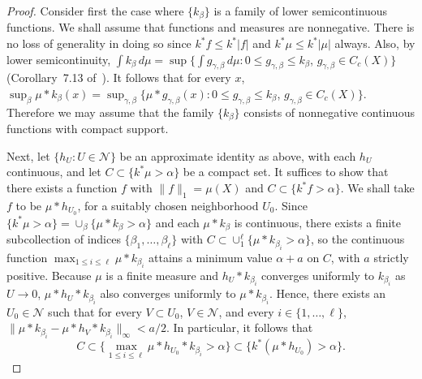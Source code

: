 \documentclass[12pt,a4paper]{amsart}
\theoremstyle{plain}
\theoremstyle{remark}
\begin{document}
\begin{proof}
Consider first the case where $\{k_{\beta}\}$ is a family of
lower semicontinuous functions. We shall assume that
functions and measures are nonnegative.
There is no loss of generality in doing so since
$k^* f \le k^*|f|$ and
$k^*\mu \le k^*|\mu|$
always. Also,
by lower semicontinuity,
$\int k_{\beta} \, d\mu = \sup \{\int g_{\gamma,\beta} \, d\mu :
0\le g_{\gamma ,\beta} \le k_\beta$,
$g_{\gamma,\beta} \in C_c(X)\}$ (Corollary~7.13 of~\cite{Fo}).
It follows that for every $x$,
$\sup_\beta \mu *k_{\beta} (x) = \sup_{\gamma, \beta}
\{\mu *g_{\gamma,\beta} (x): 0\le g_{\gamma ,\beta} \le k_\beta$,
$g_{\gamma ,\beta} \in C_c(X)\}$. Therefore
we may assume that the family $\{k_{\beta}\}$
consists of nonnegative continuous functions with compact support.

Next, let $\{h_U: U \in \mathcal{N}\}$ be an approximate identity as above,
with each $h_U$ continuous, and
let $C \subset \{k^* \mu > \alpha\}$
be a compact set. It suffices to show that there exists
a function $f$ with $\| f \|_1 = \mu(X)$ and
$C \subset \{k^* f > \alpha\}$. We shall take $f$ to be $\mu*h_{U_0}$,
for a suitably chosen neighborhood $U_0$. Since
$\{k^* \mu > \alpha\} = \cup_\beta \{\mu *k_\beta > \alpha\}$ and each
$\mu *k_\beta $ is continuous, there exists a finite subcollection of
indices $\{\beta_1, \dots , \beta_\ell\}$ with
$C \subset \cup_1^\ell \{\mu *k_{\beta_i} > \alpha\}$, so the continuous
function $\max_{1\le i\le \ell} \mu *k_{\beta_i} $ attains a minimum
value $\alpha + a$ on $C$, with $a$ strictly positive.
Because $\mu$ is a finite measure and $h_U * k_{\beta_i}$
converges uniformly to $k_{\beta_i}$ as $U \to 0$,
$\mu * h_U * k_{\beta_i}$ also
converges uniformly to $\mu * k_{\beta_i}$. Hence, there exists an $U_0 \in
\mathcal{N}$ such that for every $V \subset U_0$, $V \in \mathcal{N}$, and
every $i\in \{1, \dots, \ell\}$,
$\| \mu * k_{\beta_i} - \mu * h_V * k_{\beta_i} \|_\infty < a /2$.
In particular, it follows that
\[
    C \subset \big\{ \max_{1 \le i \le \ell} \mu * h_{U_0} * k_{\beta_i}
      > \alpha \big\}
    \subset \big\{ k^*(\mu*h_{U_0})> \alpha \big\}.
\]


\end{proof}
\end{document}
